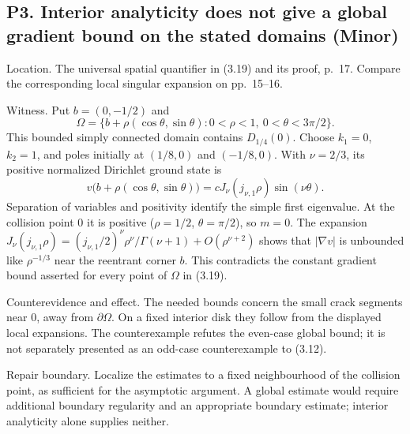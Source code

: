 \documentclass[10pt]{article}
\begin{document}
\subsection*{P3. Interior analyticity does not give a global gradient bound on the stated domains (Minor)}
Location. The universal spatial quantifier in (3.19) and its proof, p. 17. Compare the corresponding local singular expansion on pp. 15–16.\par
Witness. Put \(b=(0,-1/2)\) and \[\Omega=\{b+\rho(\cos\theta,\sin\theta):
             0<\rho<1,\ 0<\theta<3\pi/2\}.\] This bounded simply connected domain contains \(D_{1/4}(0)\). Choose \(k_1=0\), \(k_2=1\), and poles initially at \((1/8,0)\) and \((-1/8,0)\). With \(\nu=2/3\), its positive normalized Dirichlet ground state is \[v\bigl(b+\rho(\cos\theta,\sin\theta)\bigr)
   =cJ_\nu(j_{\nu,1}\rho)\sin(\nu\theta).\] Separation of variables and positivity identify the simple first eigenvalue. At the collision point \(0\) it is positive (\(\rho=1/2\), \(\theta=\pi/2\)), so \(m=0\). The expansion \(J_\nu(j_{\nu,1}\rho)
 = (j_{\nu,1}/2)^\nu\rho^\nu/\Gamma(\nu+1)+O(\rho^{\nu+2})\) shows that \(|\nabla v|\) is unbounded like \(\rho^{-1/3}\) near the reentrant corner \(b\). This contradicts the constant gradient bound asserted for every point of \(\Omega\) in (3.19).\par
Counterevidence and effect. The needed bounds concern the small crack segments near \(0\), away from \(\partial\Omega\). On a fixed interior disk they follow from the displayed local expansions. The counterexample refutes the even-case global bound; it is not separately presented as an odd-case counterexample to (3.12).\par
Repair boundary. Localize the estimates to a fixed neighbourhood of the collision point, as sufficient for the asymptotic argument. A global estimate would require additional boundary regularity and an appropriate boundary estimate; interior analyticity alone supplies neither.\par
\end{document}
